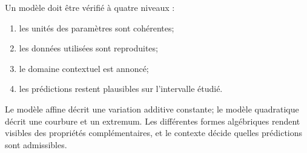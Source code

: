 Un modèle doit être vérifié à quatre niveaux :
\begin{enumerate}
\item les unités des paramètres sont cohérentes;
\item les données utilisées sont reproduites;
\item le domaine contextuel est annoncé;
\item les prédictions restent plausibles sur l'intervalle étudié.
\end{enumerate}

\begin{summarybox}
Le modèle affine décrit une variation additive constante; le modèle quadratique décrit une courbure et un extremum. Les différentes formes algébriques rendent visibles des propriétés complémentaires, et le contexte décide quelles prédictions sont admissibles.
\end{summarybox}
